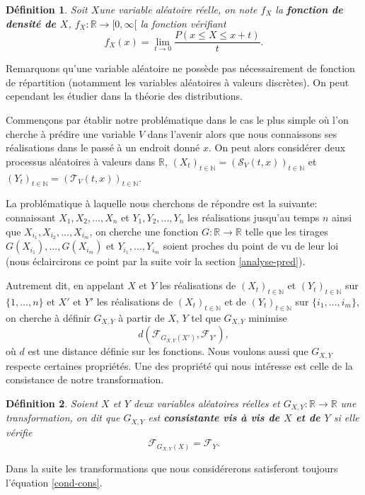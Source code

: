 \documentclass[a4paper,10pt]{article}
\newtheorem{definition}{Définition}
\begin{document}
\begin{definition}
	Soit $X$une variable aléatoire réelle, on note $f_{X}$ la \textbf{fonction de densité de $X$}, $f_{X}: \mathbb{R}\to [0,\infty[$ la fonction vérifiant
	\begin{equation}
		f_{X}(x)=\lim_{t\to 0} \frac{P(x\leq X \leq x+t)}{t}.
	\end{equation}
\end{definition}
Remarquons qu'une variable aléatoire ne possède pas nécessairement de fonction de répartition (notamment les variables aléatoires à valeurs discrètes). On peut cependant les étudier dans la théorie des distributions.


Commençons par établir notre problématique dans le cas le plus simple où l'on cherche à prédire une variable $V$ dans l'avenir alors que nous connaissons ses réalisations dans le passé à un endroit donné $x$.
On peut alors considérer deux processus aléatoires à valeurs dans $\mathbb{R}$, $(X_t)_{t \in \mathbb{N}}=(\mathcal{S}_{V}(t, x))_{t \in \mathbb{N}}$ et $(Y_t)_{t \in \mathbb{N}}=(\mathcal{T}_{V}(t, x))_{t \in \mathbb{N}}$.

La problématique à laquelle nous cherchons de répondre est la suivante: connaissant $X_1,X_2,...,X_n$ et $Y_1,Y_2,...,Y_n$ les réalisations jusqu'au temps $n$ ainsi que $X_{i_1},X_{i_2},...,X_{i_m}$, on cherche une fonction $G: \mathbb{R} \to \mathbb{R}$ telle que les tirages $G(X_{i_1}),..., G(X_{i_m})$ et $Y_{i_1},...,Y_{i_m}$ soient proches du point de vu de leur loi (nous éclaircirons ce point par la suite voir la section \ref{analyse-pred}). 

Autrement dit, en appelant $X$ et $Y$ les réalisations de $(X_t)_{t \in \mathbb{N}}$ et $(Y_t)_{t \in \mathbb{N}}$ sur $\{1,...,n\}$ et $X'$ et $Y'$ les réalisations de $(X_t)_{t \in \mathbb{N}}$ et de $(Y_t)_{t \in \mathbb{N}}$ sur $\{i_1,...,i_m\}$, on cherche à définir $G_{X,Y}$ à partir de $X$, $Y$ tel que $G_{X,Y}$ minimise 
\[d(\mathcal{F}_{G_{X,Y}(X')}, \mathcal{F}_{Y'}),\]
où $d$ est une distance définie sur les fonctions.
Nous voulons aussi que $G_{X,Y}$ respecte certaines propriétés. Une des propriété qui nous intéresse est celle de la consistance de notre transformation.

\begin{definition}
	Soient $X$ et $Y$ deux variables aléatoires réelles et $G_{X,Y}: \mathbb{R}\to \mathbb{R}$ une transformation, on dit que $G_{X,Y}$ est \textbf{consistante vis à vis de $X$ et de $Y$} si elle vérifie 
\begin{equation}
	\label{cond-cons}
	{\mathcal{F}_{G_{X,Y}(X)}}= \mathcal{F}_{Y}.
\end{equation}
\end{definition}
Dans la suite les transformations que nous considérerons satisferont toujours l'équation \eqref{cond-cons}.
\end{document}
